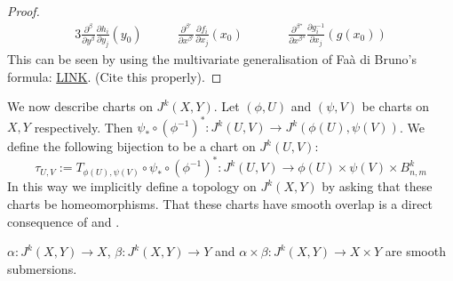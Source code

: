 \documentclass[12pt]{article}
\begin{document}
\begin{proof}
    \begin{alignat*}{3}
        \frac{\partial^{\beta}}{\partial y^\beta}\frac{\partial h_i}{\partial y_j} (y_0) \quad \quad & \frac{\partial^{\beta'}}{\partial x^{\beta'}}\frac{\partial f_i}{\partial x_j} (x_0) \quad \quad  && \frac{\partial^{\beta''}}{\partial x^{\beta''}}\frac{\partial g^{-1}_i}{\partial x_j} (g(x_0)) 
    \end{alignat*}
    This can be seen by using the multivariate generalisation of Faà di Bruno's formula: \href{https://www.ams.org/journals/tran/1996-348-02/S0002-9947-96-01501-2/S0002-9947-96-01501-2.pdf}{LINK}. (Cite this properly). 
    
    
\end{proof}


\begin{definition}
    We now describe charts on $J^k(X, Y)$. Let $(\phi, U)$ and $(\psi, V)$ be charts on $X, Y$ respectively. Then $\psi_* \circ (\phi^{-1})^*: J^k(U, V) \to J^k(\phi(U), \psi(V))$. We define the following bijection to be a chart on $J^k(U, V)$: 
    $$
    \tau_{U, V} := T_{\phi(U), \psi(V)} \circ \psi_* \circ (\phi^{-1})^*: J^k(U, V) \to \phi(U)\times \psi(V) \times B_{n, m}^k 
    $$ 
    In this way we implicitly define a topology on $J^k(X, Y)$ by asking that these charts be homeomorphisms. That these charts have smooth overlap is a direct consequence of  and . \\
\end{definition}

\begin{proposition}
    $\alpha: J^k(X, Y) \to X$, $\beta: J^k(X, Y) \to Y$ and $\alpha\times \beta: J^k(X, Y) \to X\times Y$ are smooth submersions. 
\end{proposition}
\end{document}
